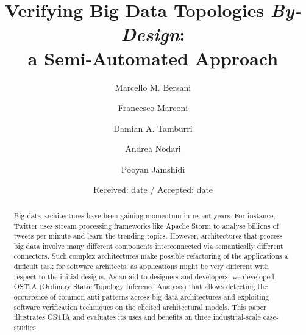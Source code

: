 \documentclass[smallextended]{svjour3}       %
\begin{document}
\title{Verifying Big Data Topologies \emph{By-Design}:\\ a Semi-Automated Approach}


\author{Marcello M. Bersani \and Francesco Marconi \and Damian A. Tamburri \and Andrea Nodari \and Pooyan Jamshidi}



\date{Received: date / Accepted: date}


\maketitle

\begin{abstract}
Big data architectures have been gaining momentum in recent years. For
instance, Twitter uses stream processing frameworks like Apache Storm to analyse billions of tweets per minute and learn the trending topics. However, architectures that process big data involve many different components interconnected via semantically different connectors. 
Such complex architectures make %
possible refactoring of the applications a difficult task for software architects, as applications might be very different with respect to the initial designs.
As an aid to designers and developers, we developed OSTIA (Ordinary Static Topology Inference Analysis) that allows detecting the occurrence of common anti-patterns across big data architectures and exploiting software verification techniques on the elicited architectural models. This paper illustrates OSTIA and evaluates its uses and benefits on three industrial-scale case-studies.
\end{abstract}
\end{document}
